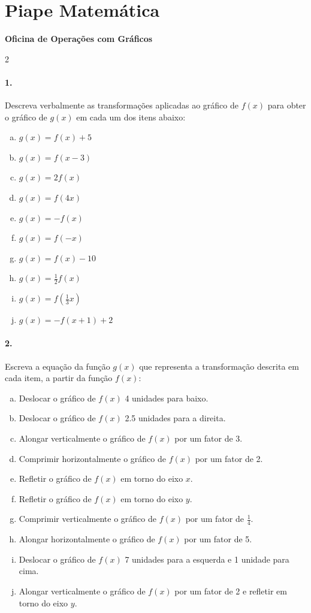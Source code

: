 \documentclass[a4paper,12pt]{article}
\begin{document}
 
  
\section*{Piape Matemática} 
\textbf{Oficina de Operações com Gráficos}\\ 
\begin{multicols}{2}
\paragraph*{1.} Descreva verbalmente as transformações aplicadas ao gráfico de $f(x)$ para obter o gráfico de $g(x)$ em cada um dos itens abaixo:

\begin{enumerate}[a)]
    \item $g(x) = f(x) + 5$
    \item $g(x) = f(x - 3)$
    \item $g(x) = 2f(x)$
    \item $g(x) = f(4x)$
    \item $g(x) = -f(x)$
    \item $g(x) = f(-x)$
    \item $g(x) = f(x) - 10$
    \item $g(x) = \frac{1}{2}f(x)$
    \item $g(x) = f\left(\frac{1}{3}x\right)$
    \item $g(x) = -f(x + 1) + 2$
\end{enumerate} \newcolumn

\paragraph*{2.} Escreva a equação da função $g(x)$ que representa a transformação descrita em cada item, a partir da função $f(x)$:
    \begin{enumerate}[a)]
        \item Deslocar o gráfico de $f(x)$ 4 unidades para baixo.
        \item Deslocar o gráfico de $f(x)$ 2.5 unidades para a direita.
        \item Alongar verticalmente o gráfico de $f(x)$ por um fator de 3.
        \item Comprimir horizontalmente o gráfico de $f(x)$ por um fator de 2.
        \item Refletir o gráfico de $f(x)$ em torno do eixo $x$.
        \item Refletir o gráfico de $f(x)$ em torno do eixo $y$.
        \item Comprimir verticalmente o gráfico de $f(x)$ por um fator de $\frac{1}{4}$.
        \item Alongar horizontalmente o gráfico de $f(x)$ por um fator de 5.
        \item Deslocar o gráfico de $f(x)$ 7 unidades para a esquerda e 1 unidade para cima.
        \item Alongar verticalmente o gráfico de $f(x)$ por um fator de 2 e refletir em torno do eixo $y$.
    \end{enumerate}

\vspace*{0cm}
\end{multicols}
 
\end{document}
